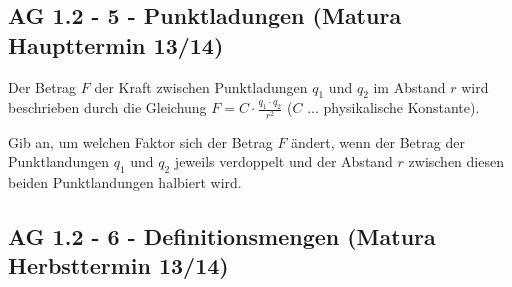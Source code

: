 \documentclass[a4paper,12pt]{article}
\begin{document}
\newpage

\smallskip\begin{minipage}{1\textwidth}
\subsection{AG 1.2 - 5 - Punktladungen (Matura Haupttermin 13/14)}\smallskip

\end{minipage}

\begin{beispiel}[AG 1.2]{1}
Der Betrag $F$ der Kraft zwischen Punktladungen $q_1$ und $q_2$ im Abstand $r$ wird beschrieben durch die Gleichung $F=C\cdot \frac{q_1\cdot q_2}{r^2}$ ($C$ ... physikalische Konstante).
	
	Gib an, um welchen Faktor sich der Betrag $F$ ändert, wenn der Betrag der Punktlandungen $q_1$ und $q_2$ jeweils verdoppelt und der Abstand $r$ zwischen diesen beiden Punktlandungen halbiert wird.\leer
	
\end{beispiel}


\newpage

\smallskip\begin{minipage}{1\textwidth}
\subsection{AG 1.2 - 6 - Definitionsmengen (Matura Herbsttermin 13/14)}\smallskip

\end{minipage}
\end{document}
